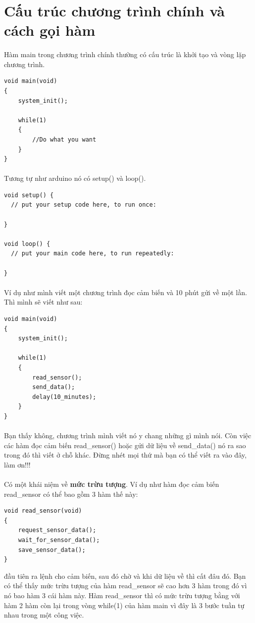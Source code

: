 \documentclass[12pt,a5paper]{book}
\begin{document}
\section{Cấu trúc chương trình chính và cách gọi hàm}
\paragraph{}
Hàm main trong chương trình chính thường có cấu trúc là khởi tạo và vòng lặp chương trình. 
\begin{lstlisting}
void main(void)
{
	system_init();
	
	while(1)
	{
		//Do what you want
	}
}
\end{lstlisting}
\paragraph{}
Tương tự như arduino nó có setup() và loop().
\begin{lstlisting}
void setup() {
  // put your setup code here, to run once:

}

void loop() {
  // put your main code here, to run repeatedly:

}
\end{lstlisting}
\paragraph{}
Ví dụ như mình viết một chương trình đọc cảm biến và 10 phút gửi về một lần. Thì mình sẽ viết như sau:
\begin{lstlisting}
void main(void)
{
	system_init();
	
	while(1)
	{
		read_sensor();
		send_data();
		delay(10_minutes);
	}
}
\end{lstlisting}
\paragraph{}
Bạn thấy không, chương trình mình viết nó y chang những gì mình nói. Còn việc các hàm đọc cảm biến read\_sensor() hoặc gửi dữ liệu về send\_data() nó ra sao trong đó thì viết ở chỗ khác. Đừng nhét mọi thứ mà bạn có thể viết ra vào đây, làm ơn!!!
\paragraph{}
Có một khái niệm về \textbf{mức trừu tượng}. Ví dụ như hàm đọc cảm biến read\_sensor có thể bao gồm 3 hàm thế này:
\begin{lstlisting}
void read_sensor(void)
{
	request_sensor_data();
	wait_for_sensor_data();
	save_sensor_data();
}
\end{lstlisting}
đầu tiên ra lệnh cho cảm biến, sau đó chờ và khi dữ liệu về thì cất đâu đó. Bạn có thể thấy mức trừu tượng của hàm read\_sensor sẽ cao hơn 3 hàm trong đó vì nó bao hàm 3 cái hàm này. Hàm read\_sensor thì có mức trừu tượng bằng với hàm 2 hàm còn lại trong vòng while(1) của hàm main vì đây là 3 bước tuần tự nhau trong một công việc.
\end{document}
